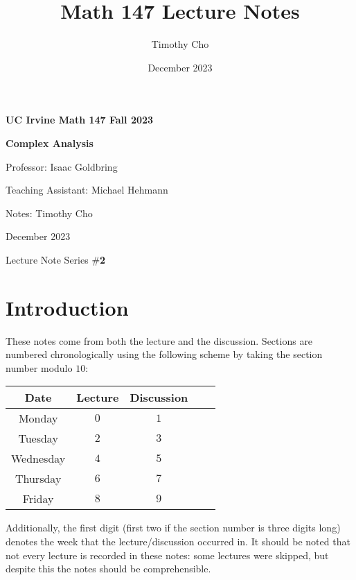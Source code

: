 \documentclass{article}
\title{Math 147 Lecture Notes}
\author{Timothy Cho}
\date{December 2023}
\begin{document}
\begin{titlepage}
    \begin{center}
        \vspace*{1cm}
            
        \Huge
        \textbf{UC Irvine Math 147 Fall 2023}
        
        \vspace{0.1 cm}
        \huge
        \textbf{Complex Analysis}
        \vspace{0.4cm}
            
        \vspace{1.5cm}
        \Large    
        \textsf{Professor: Isaac Goldbring}

        \textsf{Teaching Assistant: Michael Hehmann}
        
        \textsf{Notes: Timothy Cho}
            
        \vfill
            

            
        \vspace{0.8cm}
            

        \Large
        December 2023

        Lecture Note Series \#\textbf{2}
            
    \end{center}
\end{titlepage}
\section*{Introduction}
These notes come from both the lecture and the discussion. Sections are numbered chronologically using the following scheme by taking the section number modulo $10$:
\begin{center}
\begin{tabular}{|c|c|c|c|c|}\hline
Date & Lecture & Discussion \\ \hline
Monday & $0$ & $1$  \\
Tuesday & $2$ & $3$ \\
Wednesday & $4$ & $5$ \\
Thursday & $6$ & $7$ \\
Friday & $8$ & $9$ \\ \hline
\end{tabular}
\end{center}
Additionally, the first digit (first two if the section number is three digits long) denotes the week that the lecture/discussion occurred in. It should be noted that not every lecture is recorded in these notes: some lectures were skipped, but despite this the notes should be comprehensible.
\end{document}
